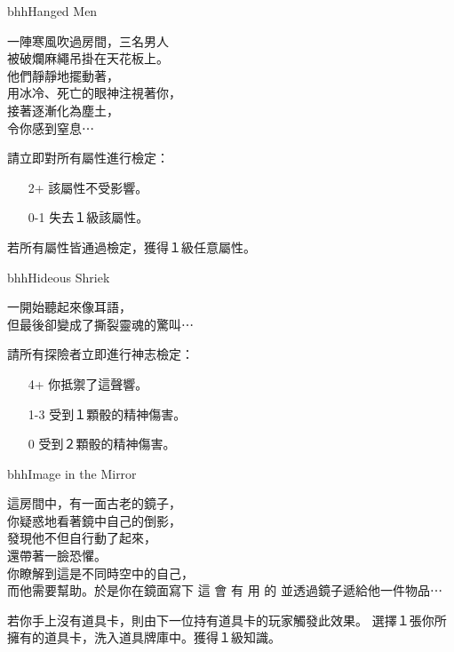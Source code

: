 \linebreak[0]%
\begin{EventCard}{bhh}{Hanged Men}
  \begin{CardStory}
    一陣寒風吹過房間，三名男人\\
    被破爛麻繩吊掛在天花板上。\\
    他們靜靜地擺動著，\\
    用冰冷、死亡的眼神注視著你，\\
    接著逐漸化為塵土，\\
    令你感到窒息⋯
  \end{CardStory}
  請立即對所有屬性進行檢定：
  \begin{itemize}
    \item[2+] 該屬性不受影響。
    \item[0-1] 失去１級該屬性。
  \end{itemize}
  若所有屬性皆通過檢定，獲得１級任意屬性。\smallbreak
\end{EventCard}%
\linebreak[0]%
\begin{EventCard}{bhh}{Hideous Shriek}
  \begin{CardStory}
    一開始聽起來像耳語，\\
    但最後卻變成了撕裂靈魂的驚叫⋯
  \end{CardStory}
  請所有探險者立即進行神志檢定：
  \begin{itemize}
    \item[4+] 你抵禦了這聲響。
    \item[1-3] 受到１顆骰的精神傷害。
    \item[0] 受到２顆骰的精神傷害。
  \end{itemize}
\end{EventCard}%
\linebreak[0]%
\begin{EventCard}{bhh}{Image in the Mirror}
  \begin{CardStory}
    這房間中，有一面古老的鏡子，\\
    你疑惑地看著鏡中自己的倒影，\\
    發現他不但自行動了起來，\\
    還帶著一臉恐懼。\\
    你瞭解到這是不同時空中的自己，\\
    而他需要幫助。於是你在鏡面寫下\smallbreak
    { \FontScript 這 \enskip 會 \enskip 有 \enskip 用 \enskip 的 }\smallbreak
    並透過鏡子遞給他一件物品⋯
\end{CardStory}
  若你手上沒有道具卡，則由下一位持有道具卡的玩家觸發此效果。\smallbreak
  選擇１張你所擁有的道具卡，洗入道具牌庫中。獲得１級知識。\smallbreak
\end{EventCard}%

